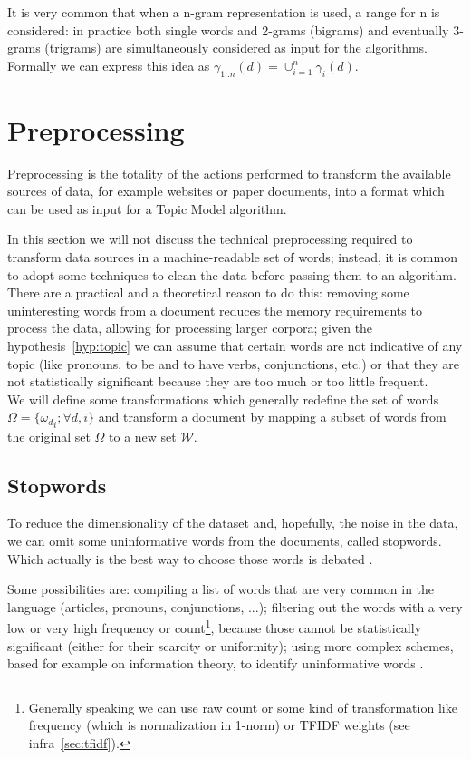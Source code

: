 \documentclass[11pt, a4paper, oneside, openright]{book}
\begin{document}
It is very common that when a n-gram representation is used, a range for n is considered: in practice both single words and 2-grams (bigrams) and eventually 3-grams (trigrams) are simultaneously considered as input for the algorithms. Formally we can express this idea as $\gamma_{1..n}(d) = \cup_{i=1}^n \gamma_i(d)$.

\section{Preprocessing}
Preprocessing is the totality of the actions performed to transform the available sources of data, for example websites or paper documents, into a format which can be used as input for a Topic Model algorithm.

In this section we will not discuss the technical preprocessing required to transform data sources in a machine-readable set of words; instead, it is common to adopt some techniques to clean the data before passing them to an algorithm.
There are a practical and a theoretical reason to do this: removing some uninteresting words from a document reduces the memory requirements to process the data, allowing for processing larger corpora; given the hypothesis~\ref{hyp:topic} we can assume that certain words are not indicative of any topic (like pronouns, to be and to have verbs, conjunctions, etc.) or that they are not statistically significant because they are too much or too little frequent.\\
We will define some transformations which generally redefine the set of words $\Omega = \{{\omega_d}_i 	; \forall d,i\}$ and transform a document by mapping a subset of words from the original set $\Omega$ to a new set $\mathcal{W}$.

\subsection{Stopwords}
\label{sec:sw}
To reduce the dimensionality of the dataset and, hopefully, the noise in the data, we can omit some uninformative words from the documents, called stopwords. Which actually is the best way to choose those words is debated \parencite{schofield2017}.

Some possibilities are: compiling a list of words that are very common in the language (articles, pronouns, conjunctions, ...); filtering out the words with a very low or very high frequency or count\footnote{Generally speaking we can use raw count or some kind of transformation like frequency (which is normalization in 1-norm) or TFIDF weights (see infra~\ref{sec:tfidf}).}, because those cannot be statistically significant (either for their scarcity or uniformity); using more complex schemes, based for example on information theory, to identify uninformative words \parencite{gerlach2019}.
\end{document}
